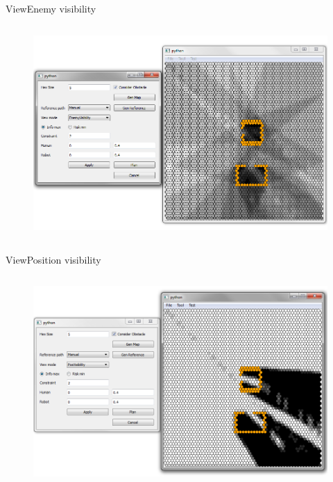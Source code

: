 \begin{frame}{View}{Enemy visibility}

\begin{columns}
\begin{figure}
\centering
\includegraphics[width = \textwidth]{./screenshot/enemy_visibility_view.png}
\end{figure}

\begin{minipage}{\textwidth}
\end{minipage}
\end{columns}

\end{frame}

\begin{frame}{View}{Position visibility}

\begin{columns}
\begin{figure}
\centering
\includegraphics[width = \textwidth]{./screenshot/position_visibility_view1.png}
\end{figure}

\begin{minipage}{\textwidth}
\end{minipage}
\end{columns}

\end{frame}

